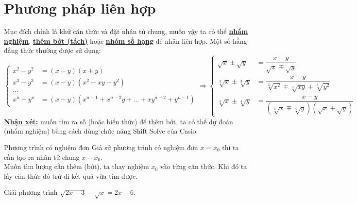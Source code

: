 
\section{Phương pháp liên hợp}

\begin{note}
Mục đích chính là khử căn thức và đặt nhân tử chung, muốn vậy ta có thể \underline{\textbf{nhẩm nghiệm}}, \textbf{\underline{thêm bớt (tách)}} hoặc \underline{\textbf{nhóm số hạng}} để nhân liên hợp. Một số hằng đẳng thức thường được sử dụng:
\[
\begin{cases}
x^{2}-y^{2}&=(x-y)(x+y)\\
x^{3}-y^{3}&=(x-y)(x^{2}-xy+y^{2})\\
...\\
x^{n}-y^{n}&=(x-y)(x^{n-1}+x^{n-2}y+...+xy^{n-2}+y^{n-1})
\end{cases}
\Rightarrow
\begin{cases}
\sqrt{x}\pm\sqrt{y}&=\dfrac{x-y}{\sqrt{x}\mp\sqrt{y}}\\
\sqrt[3]{x}\pm\sqrt[3]{y}&=\dfrac{x-y}{\sqrt[3]{x^{2}}\mp\sqrt[3]{xy}+\sqrt[3]{y^{2}}}\\
\sqrt[4]{x}\pm\sqrt[4]{y}&=\dfrac{x-y}{(\sqrt[4]{x}\mp\sqrt[4]{y})(\sqrt{x}+\sqrt{y})}
\end{cases}
\]
\underline{\textbf{Nhận xét:}} muốn tìm ra số (hoặc biểu thức) để thêm bớt, ta có thể dự đoán (nhẩm nghiệm) bằng cách dùng chức năng Shift Solve của Casio.
\end{note}

\begin{dang}{Phương trình có nghiệm đơn}
	Giả sử phương trình có nghiệm đơn $ x=x_{0} $ thì ta cần tạo ra nhân tử chung $ x-x_{0} $.\\
	Muốn tìm lượng cần thêm (bớt), ta thay nghiệm $ x_{0} $ vào từng căn thức. Khi đó ta lấy căn thức đó trừ đi kết quả vừa tìm được.
\end{dang}

\begin{bt}%
	Giải phương trình $\sqrt{2x-3}-\sqrt{x}=2x-6$.
\end{bt}

